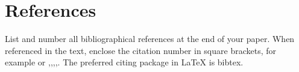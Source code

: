 \documentclass{jcst}
\begin{document}
\section{References}
List and number all bibliographical references at the end of your paper.
When referenced in the text, enclose the citation  number in square brackets,
for example \cite{article} or \cite{phdthesis},\cite{unpublished},\cite{book},\cite{proceedings},\cite{mastersthesis}. The preferred citing package in LaTeX is bibtex.



\end{document}
